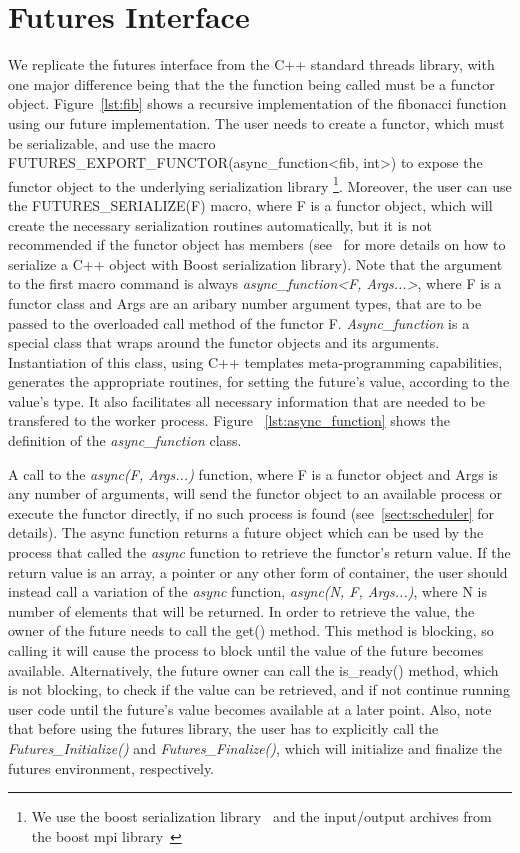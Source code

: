 \section{Futures Interface}
\label{sect:futures-interface}
We replicate the futures interface from the C++ standard threads library, with one major difference being that 
the the function being called must be a functor object.  Figure~\ref{lst:fib} shows a recursive implementation
of the fibonacci function using our future implementation.  The user needs to create a functor, which must be
serializable, and use the macro 
FUTURES\_EXPORT\_FUNCTOR(async\_function<fib, int>) to expose the functor object to the underlying 
serialization library \footnote{We use the boost serialization library~\cite{Ramey:2004:Boost:Serialization} 
and the input/output archives from the boost mpi library~\cite{Gregor:2005:Boost:MPI}}.
Moreover, the user can use the FUTURES\_SERIALIZE(F) macro, where F is a functor object, 
which will create the necessary serialization routines automatically, but it is not recommended if the 
functor object has members (see~\cite{Ramey:2004:Boost:Serialization} for more details on how to serialize
a C++ object with Boost serialization library).
Note that the argument to the first macro command is always \emph{async\_function<F, Args...>},
where F is a functor class
and Args are an aribary number argument types, that are to be passed to the overloaded call method 
of the functor F.  \emph{Async\_function} is a special class that wraps around the functor objects and its
arguments.  Instantiation of this class, using C++ templates meta-programming capabilities,
generates the appropriate routines, for setting the future's value, according to the value's type.
It also facilitates all necessary information that are needed to be transfered to the worker process.
Figure ~\ref{lst:async_function} shows the definition of the \emph{async\_function} class.


A call to the \emph{async(F, Args...)} function, where F is a functor object and Args 
is any number of arguments,
will send the functor object to an available process or execute 
the functor directly, if no such process is found (see~\ref{sect:scheduler} for details). 
The async function returns a 
future object which can be used by the process that called the \emph{async} function to retrieve the 
functor's return value.  If the return value is an array, a pointer or any other form of container, the user
should instead call a variation of the \emph{async} function, \emph{async(N, F, Args...)}, 
where N is number of elements that will be returned. In order to retrieve the value,
the owner of the future needs to call the get() method.  This method is blocking, so calling it will cause the 
process to block until the value of the future becomes available.  Alternatively, the future owner can call the
is\_ready() method, which is not blocking, to check if the value can be retrieved, and if not continue running
user code until the future's value becomes available at a later point.  Also, note that before using
the futures library, the user has to explicitly call the \emph{Futures\_Initialize()} and \emph{Futures\_Finalize()},
which will initialize and finalize the futures environment, respectively. 

